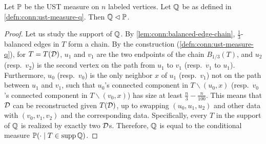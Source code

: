 \begin{lemma}[Contiguity] \label{lem:conn:ust-contig}
  Let $\mathbb{P}$ be the UST measure on $n$ labeled vertices.
  Let $\mathbb{Q}$ be as defined in \cref{defn:conn:ust-measure-q}.
  Then $\mathbb{Q} \vartriangleleft \mathbb{P}$.
\end{lemma}
\begin{proof}
  Let us study the support of $\mathbb{Q}$.
  By \cref{lem:conn:balanced-edge-chain}, $\frac 13$-balanced edges in $T$ form a chain.
  By the construction (\cref{defn:conn:ust-measure-q}), for $T=T(\mathcal{D})$, $u_1$ and $v_1$ are the two endpoints of the chain $B_{1/3}(T)$, and $u_2$ (resp.~$v_2$) is the second vertex on the path from $u_1$ to $v_1$ (resp.~$v_1$ to $u_1$).
  Furthermore, $u_0$ (resp.~$v_0$) is the only neighbor $x$ of $u_1$ (resp.~$v_1$) not on the path between $u_1$ and $v_1$, such that $u_0$'s connected component in $T\backslash (u_0,x)$ (resp.~$v_0$'s connected component in $T\backslash (v_0,x)$) has size at least $\frac n3-\frac{n}{100}$.
  This means that $\mathcal{D}$ can be reconstructed given $T(\mathcal{D})$, up to swapping $(u_0,u_1,u_2)$ and other data with $(v_0,v_1,v_2)$ and the corresponding data.
  Specifically, every $T$ in the support of $\mathbb{Q}$ is realized by exactly two $\mathcal{D}$s.
  Therefore, $\mathbb{Q}$ is equal to the conditional measure $\mathbb{P}(\cdot \mid T\in \operatorname{\mathrm{supp}} \mathbb{Q})$.


\end{proof}
